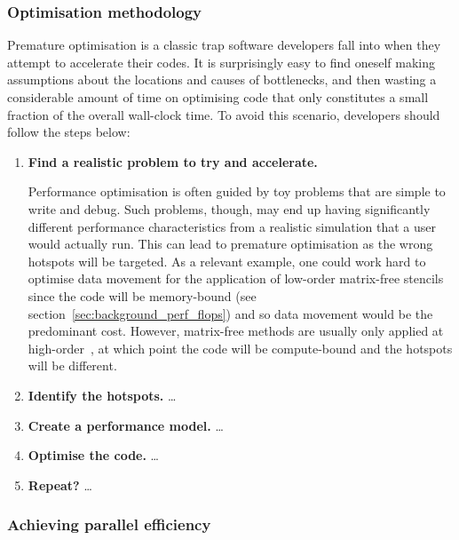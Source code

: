 \subsubsection{Optimisation methodology}

Premature optimisation is a classic trap software developers fall into when they attempt to accelerate their codes.
It is surprisingly easy to find oneself making assumptions about the locations and causes of bottlenecks, and then wasting a considerable amount of time on optimising code that only constitutes a small fraction of the overall wall-clock time.
To avoid this scenario, developers should follow the steps below:

\begin{enumerate}
  \item
    \textbf{Find a realistic problem to try and accelerate.}

    Performance optimisation is often guided by toy problems that are simple to write and debug.
    Such problems, though, may end up having significantly different performance characteristics from a realistic simulation that a user would actually run.
    This can lead to premature optimisation as the wrong hotspots will be targeted.
    As a relevant example, one could work hard to optimise data movement for the application of low-order matrix-free stencils since the code will be memory-bound (see section~\ref{sec:background_perf_flops}) and so data movement would be the predominant cost.
    However, matrix-free methods are usually only applied at high-order~\cite{brownPerformancePortableSolid2022}, at which point the code will be compute-bound and the hotspots will be different.
  \item
    \textbf{Identify the hotspots.}
    \dots
  \item
    \textbf{Create a performance model.}
    \dots
  \item
    \textbf{Optimise the code.}
    \dots
  \item
    \textbf{Repeat?}
    \dots
\end{enumerate}

\subsubsection{Achieving parallel efficiency}
\label{sec:background_perf_efficiency}

